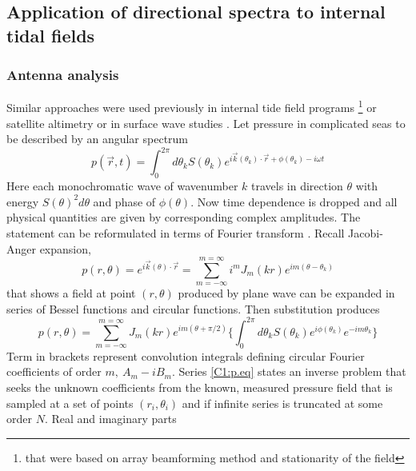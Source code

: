 \documentclass[12pt]{article}
\begin{document}
\renewcommand{\thesubsection}{\Alph{subsection}}
\setcounter{subsection}{0}
\subsection{Application of directional spectra to internal tidal fields}
\subsubsection{Antenna analysis}
\label{C3.app:A1}
Similar approaches were used previously in internal tide field programs 
\citep{hendry1977observations, lozovatsky2003spatial} \footnote{that were based on array 
beamforming method and stationarity of the field} or satellite altimetry \citep{dushaw2002mapping} 
or in surface wave studies \citep{longuet1961observations, munk1963directional, long1986inverse}. 
Let pressure in complicated seas to be described by an angular spectrum
\begin{equation}
\label{C1:eq.spectrum}
p(\vec{r}, t) = \int_0^{2\pi}  d\theta_k S(\theta_k) e^{i \vec{k}(\theta_k) \cdot \vec{r} + 
	\phi(\theta_k) - i \omega t}
\end{equation}
Here each monochromatic wave of wavenumber $k$ travels in direction $\theta$ with 
energy $S(\theta)^2 d\theta$ and phase of $\phi(\theta)$. Now time dependence is dropped and all 
physical quantities are given by corresponding complex amplitudes. The statement can be 
reformulated in terms of Fourier transform \citep{munk1963directional}. Recall Jacobi-Anger 
expansion,
\begin{equation}
p(r, \theta) = e^{i \vec{k}(\theta) \cdot \vec{r}} = \sum_{m = -\infty}^{m = \infty} i^{m} J_{m}(k 
r) e^{im(\theta - \theta_k)}
\end{equation}
that shows a field at point $(r, \theta)$ produced by plane wave can be expanded in series of 
Bessel functions and circular functions. Then substitution produces
\begin{equation}
\label{C1:p.eq}
p(r, \theta) = \sum_{m=-\infty}^{m=\infty} J_m(kr) e^{im(\theta + \pi/2)} \Big\{ \int_0^{2\pi}  
d\theta_k 
S(\theta_k) 
e^{i\phi(\theta_k)} e^{-im\theta_k} \Big\}
\end{equation}
Term in brackets represent convolution integrals defining circular Fourier coefficients of 
order $m,~A_m - i B_m$. Series \eqref{C1:p.eq} states an inverse problem that seeks the 
unknown coefficients from the known, measured pressure field that is sampled at a set of points 
$(r_i, \theta_i)$ and if infinite series is truncated at some order $N$. Real and imaginary parts 
\end{document}
